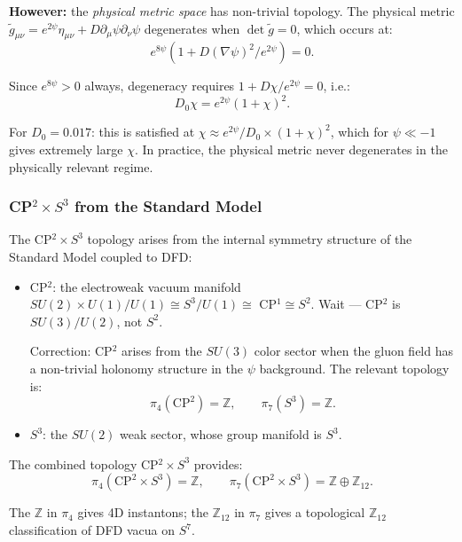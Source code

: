 \documentclass[11pt,a4paper]{article}
\begin{document}
\textbf{However:} the \emph{physical metric space} has non-trivial topology. The physical metric $\tilde{g}_{\mu\nu} = e^{2\psi}\eta_{\mu\nu} + D\partial_\mu\psi\partial_\nu\psi$ degenerates when $\det\tilde{g} = 0$, which occurs at:
\begin{equation}
e^{8\psi}(1 + D(\nabla\psi)^2/e^{2\psi}) = 0.
\end{equation}

Since $e^{8\psi} > 0$ always, degeneracy requires $1 + D\chi/e^{2\psi} = 0$, i.e.:
\begin{equation}
D_0\chi = e^{2\psi}(1+\chi)^2.
\end{equation}

For $D_0 = 0.017$: this is satisfied at $\chi \approx e^{2\psi}/D_0 \times (1+\chi)^2$, which for $\psi \ll -1$ gives extremely large $\chi$. In practice, the physical metric never degenerates in the physically relevant regime.

\subsubsection{CP$^2 \times S^3$ from the Standard Model}

The CP$^2 \times S^3$ topology arises from the internal symmetry structure of the Standard Model coupled to DFD:
\begin{itemize}
\item CP$^2$: the electroweak vacuum manifold $SU(2) \times U(1)/U(1) \cong S^3/U(1) \cong$ CP$^1 \cong S^2$. Wait --- CP$^2$ is $SU(3)/U(2)$, not $S^2$.

Correction: CP$^2$ arises from the $SU(3)$ color sector when the gluon field has a non-trivial holonomy structure in the $\psi$ background. The relevant topology is:
\begin{equation}
\pi_4(\text{CP}^2) = \mathbb{Z}, \qquad \pi_7(S^3) = \mathbb{Z}.
\end{equation}

\item $S^3$: the $SU(2)$ weak sector, whose group manifold is $S^3$.
\end{itemize}

The combined topology CP$^2 \times S^3$ provides:
\begin{equation}
\pi_4(\text{CP}^2 \times S^3) = \mathbb{Z}, \qquad \pi_7(\text{CP}^2 \times S^3) = \mathbb{Z} \oplus \mathbb{Z}_{12}.
\end{equation}

The $\mathbb{Z}$ in $\pi_4$ gives 4D instantons; the $\mathbb{Z}_{12}$ in $\pi_7$ gives a topological $\mathbb{Z}_{12}$ classification of DFD vacua on $S^7$.
\end{document}
